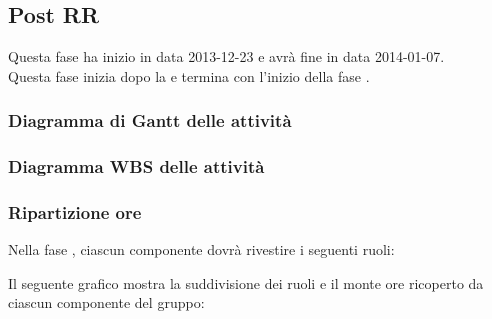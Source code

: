 \subsection{Post RR}
Questa fase ha inizio in data 2013-12-23 e avrà fine in data 2014-01-07.\\
Questa fase inizia dopo la  e termina con l'inizio della fase .

\subsubsection{Diagramma di Gantt delle attività}

\newpage
\subsubsection{Diagramma WBS delle attività}

\newpage
\subsubsection{Ripartizione ore}

\newpage
Nella fase , ciascun componente dovrà rivestire i seguenti ruoli:

Il seguente grafico mostra la suddivisione dei ruoli e il monte ore ricoperto da ciascun componente del gruppo:
